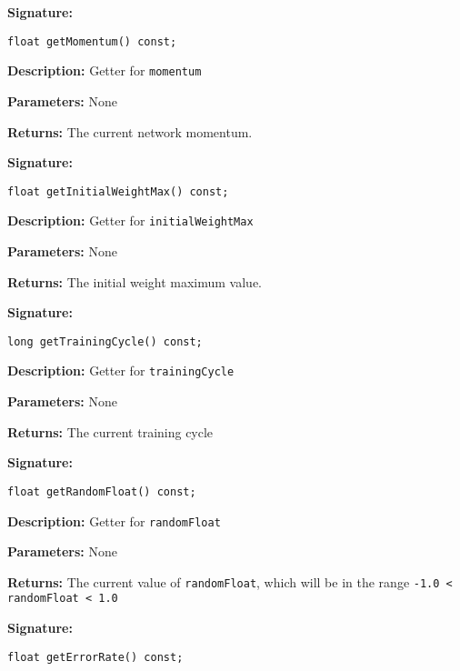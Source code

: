 \documentclass[a4paper]{article}
\begin{document}
\hrulefill %

\textbf{Signature:} \begin{lstlisting}
float getMomentum() const;
\end{lstlisting}

\textbf{Description: }
Getter for \lstinline{momentum}

\textbf{Parameters: } None

\textbf{Returns: }
The current network momentum.

\hrulefill %

\textbf{Signature:} \begin{lstlisting}
float getInitialWeightMax() const;
\end{lstlisting}

\textbf{Description: }
Getter for \lstinline{initialWeightMax}

\textbf{Parameters: } None

\textbf{Returns: }
The initial weight maximum value.

\hrulefill %

\textbf{Signature:} \begin{lstlisting}
long getTrainingCycle() const;
\end{lstlisting}

\textbf{Description: }
Getter for \lstinline{trainingCycle}

\textbf{Parameters: } None

\textbf{Returns: }
The current training cycle

\hrulefill %

\textbf{Signature:} \begin{lstlisting}
float getRandomFloat() const;
\end{lstlisting}

\textbf{Description: }
Getter for \lstinline{randomFloat}

\textbf{Parameters: } None

\textbf{Returns: }
The current value of \lstinline{randomFloat}, which will be in the range \lstinline{-1.0 < randomFloat < 1.0}

\hrulefill %

\textbf{Signature:} \begin{lstlisting}
float getErrorRate() const;
\end{lstlisting}
\end{document}
